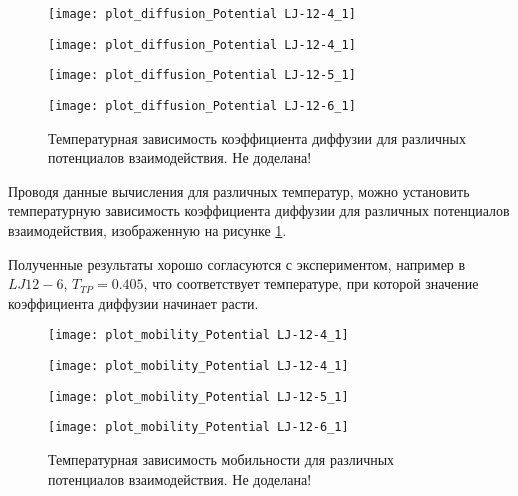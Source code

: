 \begin{figure}[h]
\begin{center}
\begin{minipage}[h]{0.45\linewidth}
\texttt{[image: plot\_diffusion\_Potential LJ-12-4\_1]}
\end{minipage}
\begin{minipage}[h]{0.45\linewidth}
\texttt{[image: plot\_diffusion\_Potential LJ-12-4\_1]}
\end{minipage}
\begin{minipage}[h]{0.45\linewidth}
\texttt{[image: plot\_diffusion\_Potential LJ-12-5\_1]}
\end{minipage}
\begin{minipage}[h]{0.45\linewidth}
\texttt{[image: plot\_diffusion\_Potential LJ-12-6\_1]}
\end{minipage}
\caption{Температурная зависимость коэффициента диффузии для различных потенциалов взаимодействия. Не доделана!}
\label{risD}
\end{center}
\end{figure}

Проводя данные вычисления для различных температур, можно установить температурную зависимость коэффициента диффузии для различных потенциалов взаимодействия, изображенную на рисунке \ref{risD}.

Полученные результаты хорошо согласуются с экспериментом, например в $LJ12-6$, $T_{TP} = 0.405$, что соответствует температуре, при которой значение коэффициента диффузии начинает расти.  


\begin{figure}[h]
\begin{center}
\begin{minipage}[h]{0.45\linewidth}
\texttt{[image: plot\_mobility\_Potential LJ-12-4\_1]}
\end{minipage}
\begin{minipage}[h]{0.45\linewidth}
\texttt{[image: plot\_mobility\_Potential LJ-12-4\_1]}
\end{minipage}
\begin{minipage}[h]{0.45\linewidth}
\texttt{[image: plot\_mobility\_Potential LJ-12-5\_1]}
\end{minipage}
\begin{minipage}[h]{0.45\linewidth}
\texttt{[image: plot\_mobility\_Potential LJ-12-6\_1]}
\end{minipage}
\caption{Температурная зависимость мобильности для различных потенциалов взаимодействия. Не доделана!}
\label{risMuDiff}
\end{center}
\end{figure}

